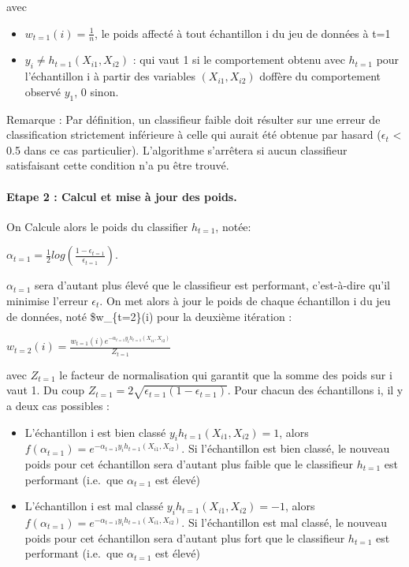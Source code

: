 \documentclass[
]{article}
\begin{document}
avec

\begin{itemize}
\item
  \(w_{t=1}(i)=\frac{1}{n}\), le poids affecté à tout échantillon i du
  jeu de données à t=1
\item
  \(y_i\ne h_{t=1}(X_{i1},X_{i2})\) : qui vaut 1 si le comportement
  obtenu avec \(h_{t=1}\) pour l'échantillon i à partir des variables
  \((X_{i1},X_{i2})\) doffère du comportement observé \(y_1\), 0 sinon.
\end{itemize}

Remarque : Par définition, un classifieur faible doit résulter sur une
erreur de classification strictement inférieure à celle qui aurait été
obtenue par hasard (\(\epsilon_t\) \textless{} 0.5 dans ce cas
particulier). L'algorithme s'arrêtera si aucun classifieur satisfaisant
cette condition n'a pu être trouvé.

\hypertarget{etape-2-calcul-et-mise-uxe0-jour-des-poids.}{%
\paragraph{Etape 2 : Calcul et mise à jour des
poids.}\label{etape-2-calcul-et-mise-uxe0-jour-des-poids.}}

On Calcule alors le poids du classifier \(h_{t=1}\), notée:

\begin{center}
$\alpha_{t=1}=\frac{1}{2}log(\frac{1-\epsilon_{t=1}}{\epsilon_{t=1}})$. 
\end{center}

\(\alpha_{t=1}\) sera d'autant plus élevé que le classifieur est
performant, c'est-à-dire qu'il minimise l'erreur \(\epsilon_t\). On met
alors à jour le poids de chaque échantillon i du jeu de données, noté
\$w\_\{t=2\}(i) pour la deuxième itération :

\begin{center}
$w_{t=2}(i)=\frac{w_{t=1}(i)e^{-\alpha_{t=1}y_ih_{t=1}(X_{i1},X_{i2})}}{Z_{t=1}}$
\end{center}

avec \(Z_{t=1}\) le facteur de normalisation qui garantit que la somme
des poids sur i vaut 1. Du coup
\(Z_{t=1}=2\sqrt{\epsilon_{t=1}(1-\epsilon_{t=1})}\). Pour chacun des
échantillons i, il y a deux cas possibles :

\begin{itemize}
\item
  L'échantillon i est bien classé \(y_ih_{t=1}(X_{i1},X_{i2})=1\), alors
  \(f(\alpha_{t=1})=e^{-\alpha_{t=1}y_ih_{t=1}(X_{i1},X_{i2})}\). Si
  l'échantillon est bien classé, le nouveau poids pour cet échantillon
  sera d'autant plus faible que le classifieur \(h_{t=1}\) est
  performant (i.e.~que \(\alpha_{t=1}\) est élevé)
\item
  L'échantillon i est mal classé \(y_ih_{t=1}(X_{i1},X_{i2})=-1\), alors
  \(f(\alpha_{t=1})=e^{-\alpha_{t=1}y_ih_{t=1}(X_{i1},X_{i2})}\). Si
  l'échantillon est mal classé, le nouveau poids pour cet échantillon
  sera d'autant plus fort que le classifieur \(h_{t=1}\) est performant
  (i.e.~que \(\alpha_{t=1}\) est élevé)
\end{itemize}
\end{document}
